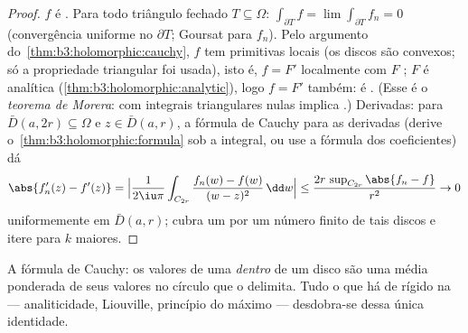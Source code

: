 \begin{proof}
$f$ é . Para todo triângulo fechado $T \subseteq
\Omega$: $\int_{\partial T}f = \lim\int_{\partial T}f_n = 0$
(convergência uniforme no  $\partial T$; Goursat para $f_n$). Pelo
argumento do~\cref{thm:b3:holomorphic:cauchy}, $f$ tem primitivas locais (os discos
são convexos; só a propriedade triangular foi usada), isto é,
$f = F'$ localmente com $F$ ; $F$ é analítica
(\cref{thm:b3:holomorphic:analytic}), logo $f = F'$ também: é . (Esse é o
\emph{teorema de Morera}:  com
integrais triangulares nulas implica .) Derivadas: para $\bar D(a, 2r) \subseteq \Omega$ e
$z \in \bar D(a, r)$, a fórmula de Cauchy para as derivadas (derive
o~\cref{thm:b3:holomorphic:formula} sob a integral, ou use a fórmula dos coeficientes) dá
\[
\abs{f_n'(z) - f'(z)} =
\Bigl|\frac{1}{2\iu\pi}\int_{C_{2r}}\frac{f_n(w) - f(w)}{(w -
z)^2}\,\dd w\Bigr|
\leq \frac{2r\,\sup_{C_{2r}}\abs{f_n - f}}{r^2} \to 0
\]
uniformemente em $\bar D(a,r)$; cubra um  por um número finito de tais
discos e itere para $k$ maiores.
\end{proof}

\begin{omfigure}

{\small A fórmula de Cauchy: os valores de uma 
\emph{dentro} de um disco são uma média ponderada de seus valores no
círculo que o delimita. Tudo o que há de rígido na  ---
analiticidade, Liouville, princípio do máximo --- desdobra-se dessa
única identidade.}
\end{omfigure}

